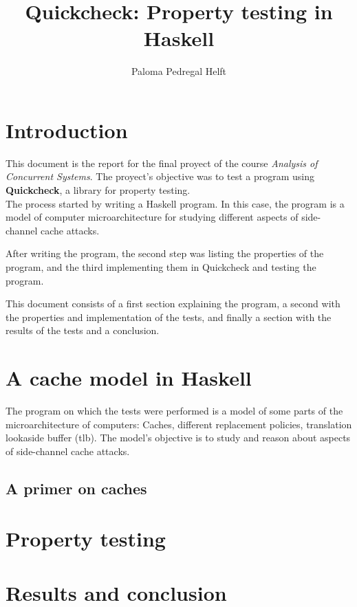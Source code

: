 \documentclass[11pt]{article}
\author{Paloma Pedregal Helft}
\date{}
\title{Quickcheck: Property testing in Haskell}
\begin{document}
\maketitle

\vspace{150px}

\tableofcontents

\clearpage

\section{Introduction}

This document is the report for the final proyect of the course \textit{Analysis of Concurrent Systems}.
The proyect's objective was to test a program using \textbf{Quickcheck}, a library for property testing.\\

The process started by writing a Haskell program. In this case, the program is a model of computer microarchitecture for studying different aspects of side-channel cache attacks.

After writing the program, the second step was listing the properties of the program, and the third implementing them in Quickcheck and testing the program.

This document consists of a first section explaining the program, a second with the properties and implementation of the tests, and finally a section with the results of the tests and a conclusion.

\clearpage

\section{A cache model in Haskell}

The program on which the tests were performed is a model of some parts of the microarchitecture of computers: Caches, different replacement policies, translation lookaside buffer (tlb). The model's objective is to study and reason about aspects of side-channel cache attacks.

\subsection{A primer on caches}

\clearpage

\section{Property testing}

\clearpage

\section{Results and conclusion}

\clearpage



\clearpage
\end{document}
